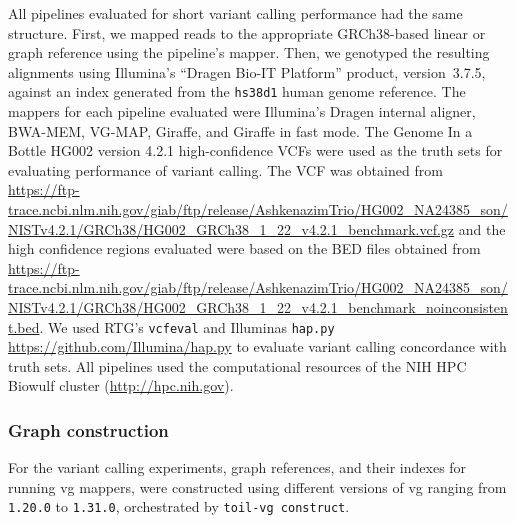 \documentclass[11pt]{ucscthesis}
\begin{document}
All pipelines evaluated for short variant calling performance had the same structure.
First, we mapped reads to the appropriate GRCh38-based linear or graph reference using the pipeline's mapper.
Then, we genotyped the resulting alignments using Illumina’s ``Dragen Bio-IT Platform'' product, version~3.7.5, against an index generated from the \texttt{hs38d1} human genome reference.
The mappers for each pipeline evaluated were Illumina’s Dragen internal aligner, BWA-MEM, VG-MAP, Giraffe, and Giraffe in fast mode.
The Genome In a Bottle HG002 version 4.2.1 high-confidence VCFs were used as the truth sets for evaluating performance of variant calling\cite{chin2020diploid}.
The VCF was obtained from \url{https://ftp-trace.ncbi.nlm.nih.gov/giab/ftp/release/AshkenazimTrio/HG002_NA24385_son/NISTv4.2.1/GRCh38/HG002_GRCh38_1_22_v4.2.1_benchmark.vcf.gz} and the high confidence regions evaluated were based on the BED files obtained from \url{https://ftp-trace.ncbi.nlm.nih.gov/giab/ftp/release/AshkenazimTrio/HG002_NA24385_son/NISTv4.2.1/GRCh38/HG002_GRCh38_1_22_v4.2.1_benchmark_noinconsistent.bed}.
We used RTG's \texttt{vcfeval} \cite{cleary2015comparing} and Illuminas \texttt{hap.py} \url{https://github.com/Illumina/hap.py} to evaluate variant calling concordance with truth sets.
All pipelines used the computational resources of the NIH HPC Biowulf cluster (\url{http://hpc.nih.gov}).



\subsubsection{Graph construction} \label{subsec:graph_construction}
For the variant calling experiments, graph references, and their indexes for running vg mappers, were constructed using different versions of vg ranging from \texttt{1.20.0} to \texttt{1.31.0}, orchestrated by \texttt{toil-vg~construct}.
\end{document}
